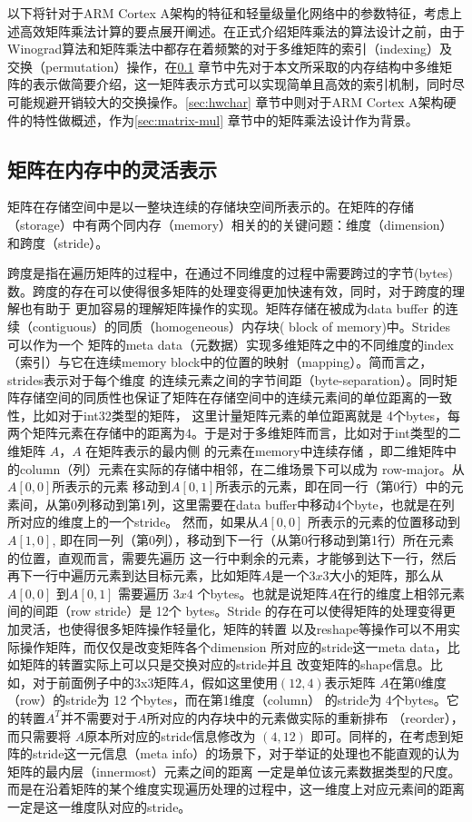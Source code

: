 以下将针对于ARM Cortex A架构的特征和轻量级量化网络中的参数特征，考虑上述高效矩阵乘法计算的要点展开阐述。在正式介绍矩阵乘法的算法设计之前，由于Winograd算法和矩阵乘法中都存在着频繁的对于多维矩阵的索引（indexing）及交换（permutation）操作，在\ref{sec:matrix_repr} 章节中先对于本文所采取的内存结构中多维矩阵的表示做简要介绍，这一矩阵表示方式可以实现简单且高效的索引机制，同时尽可能规避开销较大的交换操作。\ref{sec:hwchar} 章节中则对于ARM Cortex A架构硬件的特性做概述，作为\ref{sec:matrix-mul} 章节中的矩阵乘法设计作为背景。


\subsection{矩阵在内存中的灵活表示}
\label{sec:matrix_repr}
矩阵在存储空间中是以一整块连续的存储块空间所表示的。在矩阵的存储（storage）中有两个同内存（memory）相关的的关键问题：维度（dimension）和跨度（stride）。

跨度是指在遍历矩阵的过程中，在通过不同维度的过程中需要跨过的字节(bytes)数。跨度的存在可以使得很多矩阵的处理变得更加快速有效，同时，对于跨度的理解也有助于
更加容易的理解矩阵操作的实现。矩阵存储在被成为data buffer 的连续（contiguous）的同质（homogeneous）内存块( block of memory)中。Strides 可以作为一个
矩阵的meta data（元数据）实现多维矩阵之中的不同维度的index（索引）与它在连续memory block中的位置的映射（mapping）。简而言之，strides表示对于每个维度
的连续元素之间的字节间距（byte-separation）。同时矩阵存储空间的同质性也保证了矩阵在存储空间中的连续元素间的单位距离的一致性，比如对于int32类型的矩阵，
这里计量矩阵元素的单位距离就是 4个bytes，每两个矩阵元素在存储中的距离为4。于是对于多维矩阵而言，比如对于int类型的二维矩阵 $A$，$A$ 在矩阵表示的最内侧
的元素在memory中连续存储 ，即二维矩阵中的column（列）元素在实际的存储中相邻，在二维场景下可以成为 row-major。从$A[0, 0]$所表示的元素
移动到$A[0,1]$所表示的元素，即在同一行（第0行）中的元素间，从第0列移动到第1列，这里需要在data buffer中移动4个byte，也就是在列所对应的维度上的一个stride。
然而，如果从$A[0,0]$ 所表示的元素的位置移动到 $A[1, 0]$, 即在同一列（第0列），移动到下一行（从第0行移动到第1行）所在元素的位置，直观而言，需要先遍历
这一行中剩余的元素，才能够到达下一行，然后再下一行中遍历元素到达目标元素，比如矩阵$A$是一个$3x3$大小的矩阵，那么从 $A[0,0]$ 到$A[0,1]$ 需要遍历
$3x4$ 个bytes。也就是说矩阵$A$在行的维度上相邻元素间的间距（row stride）是 12个 bytes。Stride 的存在可以使得矩阵的处理变得更加灵活，也使得很多矩阵操作轻量化，矩阵的转置
以及reshape等操作可以不用实际操作矩阵，而仅仅是改变矩阵各个dimension 所对应的stride这一meta data，比如矩阵的转置实际上可以只是交换对应的stride并且
改变矩阵的shape信息。比如，对于前面例子中的3x3矩阵$A$，假如这里使用$(12, 4)$表示矩阵 $A$在第0维度（row）的stride为 12 个bytes，而在第1维度（column）
的stride为 4个bytes。它的转置$A^T$并不需要对于$A$所对应的内存块中的元素做实际的重新排布 （reorder），而只需要将 $A$原本所对应的stride信息修改为
$(4, 12)$ 即可。同样的，在考虑到矩阵的stride这一元信息（meta info）的场景下，对于举证的处理也不能直观的认为矩阵的最内层（innermost）元素之间的距离
一定是单位该元素数据类型的尺度。而是在沿着矩阵的某个维度实现遍历处理的过程中，这一维度上对应元素间的距离一定是这一维度队对应的stride。

